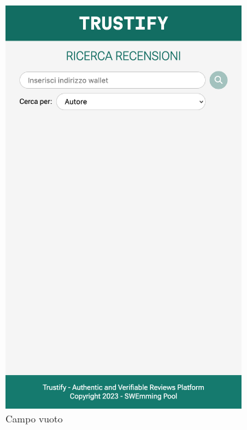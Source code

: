 \begin{figure}[H]
    \centering
    \begin{subfigure}[t]{0.49\textwidth}
    \centering
    \includegraphics[width=0.7\linewidth]{src/img/ricerca_recensioni.png}
    \caption{Campo vuoto}\label{fig:ricerca_recensioni_vuoto}
    \end{subfigure}
    \centering
    \begin{subfigure}[t]{0.49\textwidth}
    \centering

\end{subfigure}
\end{figure}
